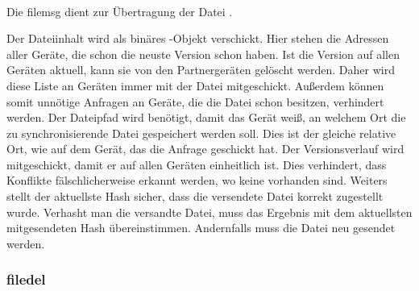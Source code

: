 	\begin{rightwordgroup}{\isprotomsgdata}
		 \\
		\skippedwords \\
		 \\
		 \\
		\skippedwords \\
		 \\
		 \\
		\skippedwords \\
		 \\
		 \\
		\skippedwords \\
	\end{rightwordgroup}
	
Die \gls{filemsg} dient zur Übertragung der Datei .
\begin{description}
		Der Dateiinhalt wird als binäres -Objekt verschickt.
		Hier stehen die Adressen aller Geräte, die schon die neuste Version schon haben. Ist die Version auf allen Geräten aktuell, kann sie von den Partnergeräten gelöscht werden. Daher wird diese Liste an Geräten immer mit der Datei mitgeschickt. Außerdem können somit unnötige Anfragen an Geräte, die die Datei schon besitzen, verhindert werden.
		Der Dateipfad wird benötigt, damit das Gerät weiß, an welchem Ort die zu synchronisierende Datei gespeichert werden soll. Dies ist der gleiche relative Ort, wie auf dem Gerät, das die Anfrage geschickt hat.
		Der Versionsverlauf wird mitgeschickt, damit er auf allen Geräten einheitlich ist. Dies verhindert, dass Konflikte fälschlicherweise erkannt werden, wo keine vorhanden sind. Weiters stellt der aktuellste Hash sicher, dass die versendete Datei korrekt zugestellt wurde. Verhasht man die versandte Datei, muss das Ergebnis mit dem aktuellsten mitgesendeten Hash übereinstimmen. Andernfalls muss die Datei neu gesendet werden.
\end{description}
		
\subsubsection{\gls{filedel}}
\messagestart
	 \\
	

